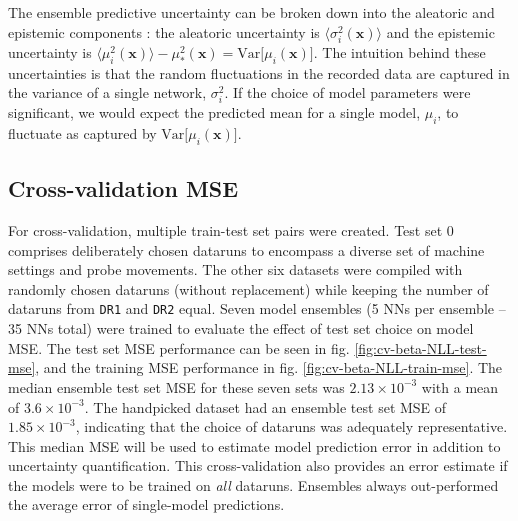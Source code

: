 The ensemble predictive uncertainty can be broken down into the aleatoric and epistemic components \cite{valdenegro-toro_deeper_2022}: the aleatoric uncertainty is $\langle \sigma^2_i (\mathbf{x}) \rangle$ and the epistemic uncertainty is $\langle \mu^2_i (\mathbf{x}) \rangle - \mu^2_* (\mathbf{x}) = \text{Var}\lbrack\mu_i (\mathbf{x}) \rbrack$. The intuition behind these uncertainties is that the random fluctuations in the recorded data are captured in the variance of a single network, $\sigma^2_i$. If the choice of model parameters were significant, we would expect the predicted mean for a single model, $\mu_i$, to fluctuate as captured by $\text{Var}\lbrack\mu_i (\mathbf{x}) \rbrack$. 



\subsection{Cross-validation MSE}

For cross-validation, multiple train-test set pairs were created. Test set 0 comprises deliberately chosen dataruns to encompass a diverse set of machine settings and probe movements. The other six datasets were  compiled with randomly chosen dataruns (without replacement) while keeping the number of dataruns from \texttt{DR1} and \texttt{DR2} equal. Seven model ensembles (5 NNs per ensemble -- 35 NNs total) were trained to evaluate the effect of test set choice on model MSE. The test set MSE performance can be seen in fig. \ref{fig:cv-beta-NLL-test-mse}, and the training MSE performance in fig. \ref{fig:cv-beta-NLL-train-mse}. The median ensemble test set MSE for these seven sets was $2.13 \times 10^{-3}$ with a mean of $3.6 \times 10^{-3}$. The handpicked dataset had an ensemble test set MSE of $1.85 \times 10^{-3}$, indicating that the choice of dataruns was adequately representative. This median MSE will be used to estimate model prediction error in addition to uncertainty quantification. This cross-validation also provides an error estimate if the models were to be trained on \emph{all} dataruns. Ensembles always out-performed the average error of single-model predictions.

